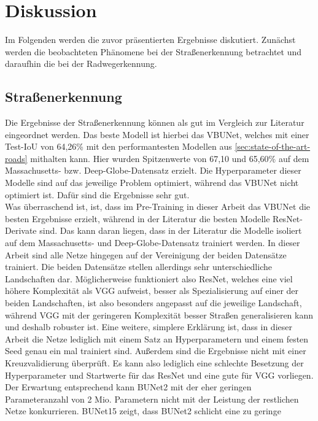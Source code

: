\chapter{Diskussion}

Im Folgenden werden die zuvor präsentierten Ergebnisse diskutiert. Zunächst werden die beobachteten Phänomene 
bei der Straßenerkennung betrachtet und daraufhin die bei der Radwegerkennung.

\section{Straßenerkennung}

Die Ergebnisse der Straßenerkennung können als gut im Vergleich zur Literatur eingeordnet werden. 
Das beste Modell ist hierbei das \ac{VBUNet}, welches mit einer Test-IoU von 64,26\% mit den 
performantesten Modellen aus \autoref{sec:state-of-the-art-roads} mithalten kann. Hier wurden 
Spitzenwerte von 67,10 und 65,60\% auf dem Massachusetts- bzw. Deep-Globe-Datensatz erzielt. 
Die Hyperparameter dieser Modelle sind auf das jeweilige Problem optimiert, während das VBUNet nicht optimiert ist. 
Dafür sind die Ergebnisse sehr gut. \\  
Was überraschend ist, ist, dass im Pre-Training in dieser Arbeit 
das VBUNet die besten Ergebnisse erzielt, während in der Literatur die besten Modelle ResNet-Derivate sind. 
Das kann daran liegen, dass in der Literatur die Modelle isoliert auf dem Massachusetts- und Deep-Globe-Datensatz 
trainiert werden. In dieser Arbeit sind alle Netze hingegen auf der Vereinigung der beiden Datensätze trainiert. 
Die beiden Datensätze stellen allerdings sehr unterschiedliche Landschaften dar. 
Möglicherweise funktioniert also ResNet, welches eine viel höhere Komplexität als VGG aufweist, besser 
als Spezialisierung auf einer der beiden Landschaften, ist also besonders angepasst auf die jeweilige Landschaft, 
während VGG mit der geringeren Komplexität besser Straßen generalisieren kann und deshalb robuster ist. 
Eine weitere, simplere Erklärung ist, dass in dieser Arbeit die Netze lediglich mit einem Satz 
an Hyperparametern und einem festen Seed genau ein mal trainiert sind. Außerdem sind die Ergebnisse 
nicht mit einer Kreuzvalidierung überprüft.
Es kann also lediglich eine schlechte Besetzung der Hyperparameter und Startwerte für das ResNet und eine 
gute für VGG vorliegen. \\
Der Erwartung entsprechend kann BUNet2 mit der eher geringen Parameteranzahl von 2 Mio. Parametern nicht 
mit der Leistung der restlichen Netze konkurrieren. BUNet15 zeigt, dass BUNet2 schlicht eine zu geringe 
